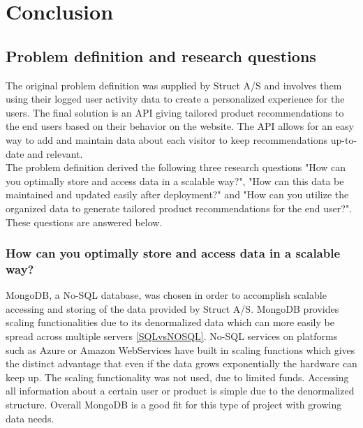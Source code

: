 
\chapter{Conclusion} %

\label{Chapter8} %


\section{Problem definition and research questions}

The original problem definition was supplied by Struct A/S and involves them using their logged user activity data to create a personalized experience for the users. The final solution is an API giving tailored product recommendations to the end users based on their behavior on the website. The API allows for an easy way to add and maintain data about each visitor to keep recommendations up-to-date and relevant. \\
The problem definition derived the following three research questions "How can you optimally store and access data in a scalable way?",  "How can this data be maintained and updated easily after deployment?" and "How can you utilize the organized data to generate tailored product recommendations for the end user?". These questions are answered below.

\subsection{How can you optimally store and access data in a scalable way?}
MongoDB, a No-SQL database, was chosen in order to accomplish scalable accessing and storing of the data provided by Struct A/S. MongoDB provides scaling functionalities due to its denormalized data which can more easily be spread across multiple servers \ref{SQLvsNOSQL}. No-SQL services on platforms such as Azure or Amazon WebServices have built in scaling functions \cite{azureNoSQL} which gives the distinct advantage that even if the data grows exponentially the hardware can keep up. The scaling functionality was not used, due to limited funds. Accessing all information about a certain user or product is simple due to the denormalized structure. Overall MongoDB is a good fit for this type of project with growing data needs.

